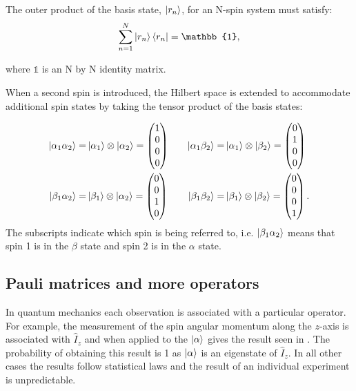 The outer product of the basis state, $\ket{r_n}$, for an N-spin system must satisfy:
\begin{equation}
  \sum_{n=1}^{N} \ket{r_n}\bra{r_n} = \mathbb{1},
\end{equation}

where $\mathbb{1}$ is an N by N identity matrix.

When a second spin is introduced, the Hilbert space is extended to accommodate additional spin
states by taking the tensor product of the basis states:

\begin{align}\label{eqn:2spinstates}
\ket{\alpha_{1}\alpha_{2}} =& \ket{\alpha_1} \otimes \ket{\alpha_2} = \begin{pmatrix}
  1\\
  0\\
  0\\
  0
\end{pmatrix} &\quad
\ket{\alpha_{1}\beta_{2}} =& \ket{\alpha_1} \otimes \ket{\beta_2} = \begin{pmatrix}
  0\\
  1\\
  0\\
  0
\end{pmatrix}\\
\ket{\beta_{1}\alpha_{2}} =& \ket{\beta_1} \otimes \ket{\alpha_2} = \begin{pmatrix}
  0\\
  0\\
  1\\
  0
\end{pmatrix} &\quad
\ket{\beta_{1}\beta_{2}} =& \ket{\beta_1} \otimes \ket{\beta_2} = \begin{pmatrix}
  0\\
  0\\
  0\\
  1
\end{pmatrix}.
\end{align}
The subscripts indicate which spin is being referred to, i.e. $\ket{\beta_1\alpha_2}$ means that
spin 1 is in the $\beta$ state and spin 2 is in the $\alpha$ state.

\subsection{Pauli matrices and more operators}

In quantum mechanics each observation is associated with a particular operator. For
example, the measurement of the spin angular momentum along the $z$-axis is associated with
$\hat{I}_z$ and when applied to the $\ket{\alpha}$ gives the result seen in . The
probability of obtaining this result is 1 as $\ket{\alpha}$ is an eigenstate of $\hat{I}_z$. In
all other cases the results follow statistical laws and the result of an individual experiment
is unpredictable.

